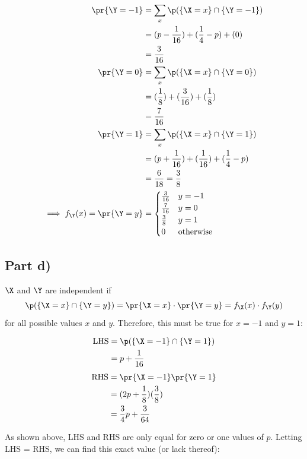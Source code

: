 \begin{align*}
\pr{\Y = -1} &= \sum _x \p(\{ \X = x \} \cap \{ \Y = -1 \}) \\
&= (p - \frac{1}{16}) + (\frac{1}{4} - p) + (0) \\
&= \frac{3}{16} \\
\pr{\Y = 0} &= \sum _x \p(\{ \X = x \} \cap \{ \Y = 0 \}) \\
&= (\frac{1}{8}) + (\frac{3}{16}) + (\frac{1}{8}) \\
&= \frac{7}{16} \\
\pr{\Y = 1} &= \sum _x \p(\{ \X = x \} \cap \{ \Y = 1 \}) \\
&= (p + \frac{1}{16}) + (\frac{1}{16}) + (\frac{1}{4} - p) \\
&= \frac{6}{18} = \frac{3}{8} \\
\implies f_{\Y}(x) = \pr{\Y = y} &= \begin{cases}
\frac{3}{16} & y = -1 \\
\frac{7}{16} & y = 0 \\
\frac{3}{8} & y = 1 \\
0 & \text{otherwise}
\end{cases}
\end{align*}

\subsection{Part d)}

$\X$ and $\Y$ are independent if
\begin{equation} \label{th:q1d-independence}
\p(\{ \X = x \} \cap \{ \Y = y \}) = \pr{\X = x} \cdot \pr{\Y = y} = f_\X(x) \cdot f_\Y(y)
\end{equation}
for all possible values $x$ and $y$. Therefore, this must be true for $x = -1$ and $y = 1$:

\begin{multicols}{2}
\begin{align*}
\mathrm{LHS} &= \p(\{ \X = -1 \} \cap \{ \Y = 1 \}) \\
&= p + \frac{1}{16}
\end{align*}
\begin{align*}
\mathrm{RHS} &= \pr{\X = -1}\pr{\Y = 1} \\
&= (2p + \frac{1}{8})(\frac{3}{8}) \\
&= \frac{3}{4}p + \frac{3}{64}
\end{align*}
\end{multicols}

As shown above, LHS and RHS are only equal for zero or one values of $p$. Letting LHS = RHS, we can find this exact value (or lack thereof):

